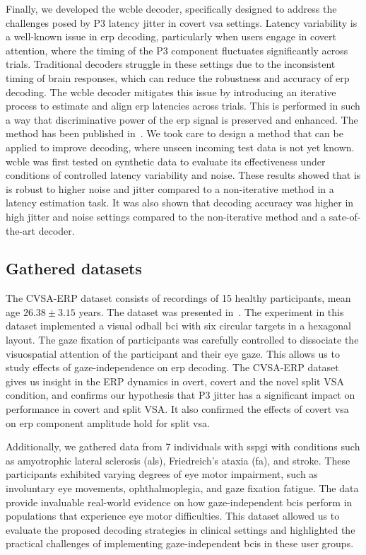 Finally, we developed the \acf{wcble} decoder, specifically designed to address
the challenges posed by P3 latency jitter in covert \ac{vsa} settings.
Latency variability is a well-known issue in \ac{erp} decoding, particularly
when users engage in covert attention, where the timing of the P3 component
fluctuates significantly across trials.
Traditional decoders struggle in these settings due to the inconsistent timing
of brain responses, which can reduce the robustness and accuracy of
\ac{erp} decoding.
The \ac{wcble} decoder mitigates this issue by introducing an iterative process
to estimate and align \ac{erp} latencies across trials.
This is performed in such a way that discriminative power of the \ac{erp}
signal is preserved and enhanced.
The method has been published in~\textcite{VanDenKerchove2024}.
We took care to design a method that can be applied to improve decoding, where
unseen incoming test data is not yet known.
\Ac{wcble} was first tested on synthetic data to evaluate its
effectiveness under conditions of controlled latency variability and noise.
These results showed that is is robust to higher noise and jitter compared to
a non-iterative method in a latency estimation task.
It was also shown that decoding accuracy was higher in high jitter and noise
settings compared to the non-iterative method and a sate-of-the-art decoder.

\subsection{Gathered datasets}
The CVSA-ERP dataset consists of recordings of 15 healthy participants, mean age
$26.38\pm3.15$ years.
The dataset was presented in~\textcite{VanDenKerchove2024}.
The experiment in this dataset implemented a visual odball \ac{bci} with six
circular targets in a hexagonal layout.
The gaze fixation of participants was carefully controlled to dissociate the
visuospatial attention of the participant and their eye gaze.
This allows us to study effects of gaze-independence on \ac{erp} decoding.
The CVSA-ERP dataset gives us insight in the ERP dynamics in overt, covert and the
novel split VSA condition, and confirms our hypothesis that P3 jitter has a
significant impact on performance in covert and split VSA.
It also confirmed the effects of covert \ac{vsa} on \ac{erp} component
amplitude hold for split \ac{vsa}.

Additionally, we gathered data from 7 individuals with \ac{sspgi} with conditions such as
amyotrophic lateral sclerosis (\ac{als}), Friedreich's ataxia (\ac{fa}), and stroke.
These participants exhibited varying degrees of eye motor impairment, such as
involuntary eye movements, ophthalmoplegia, and gaze fixation fatigue.
The data provide invaluable real-world evidence on how gaze-independent
\acp{bci} perform in populations that experience eye motor difficulties.
This dataset allowed us to evaluate the proposed decoding strategies in clinical settings and
highlighted the practical challenges of implementing gaze-independent \acp{bci} in these user
groups.

